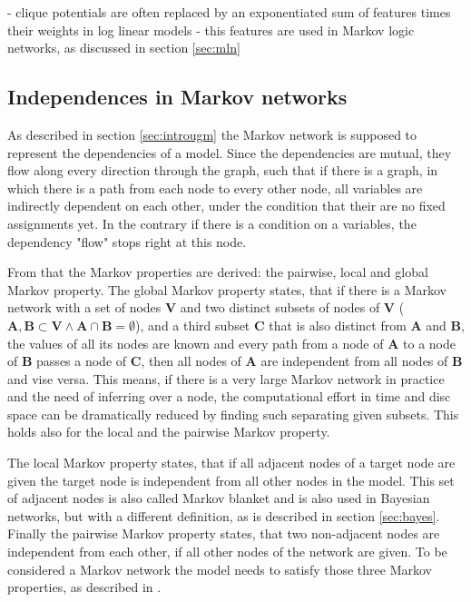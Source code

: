 
- clique potentials are often replaced by an exponentiated sum of features times their weights in log linear models
- this features are used in Markov logic networks, as discussed in section \ref{sec:mln}

\subsection{Independences in Markov networks} \label{sec:indep}

As described in section \ref{sec:introugm} the Markov network is supposed to represent the dependencies of a model. Since the dependencies are mutual, they flow along every direction through the graph, such that if there is a graph, in which there is a path from each node to every other node, all variables are indirectly dependent on each other, under the condition that their are no fixed assignments yet. In the contrary if there is a condition on a variables, the dependency "flow" stops right at this node.

From that the Markov properties are derived: the pairwise, local and global Markov property. The global Markov property states, that if there is a Markov network with a set of nodes $\mathbf{V}$ and two distinct subsets of nodes of $\mathbf{V}$ ($\mathbf{A}, \mathbf{B} \subset \mathbf{V} \wedge \mathbf{A} \cap \mathbf{B} = \emptyset$), and a third subset $\mathbf{C}$ that is also distinct from $\mathbf{A}$ and $\mathbf{B}$, the values of all its nodes are known and every path from a node of $\mathbf{A}$ to a node of $\mathbf{B}$ passes a node of $\mathbf{C}$, then all nodes of $\mathbf{A}$ are independent from all nodes of $\mathbf{B}$ and vise versa. This means, if there is a very large Markov network in practice and the need of inferring over a node, the computational effort in time and disc space can be dramatically reduced by finding such separating given subsets. This holds also for the local and the pairwise Markov property.

The local Markov property states, that if all adjacent nodes of a target node are given the target node is independent from all other nodes in the model. This set of adjacent nodes is also called Markov blanket and is also used in Bayesian networks, but with a different definition, as is described in section \ref{sec:bayes}. Finally the pairwise Markov property states, that two non-adjacent nodes are independent from each other, if all other nodes of the network are given. To be considered a Markov network the model needs to satisfy those three Markov properties, as described in \cite{markov1957theory}.


